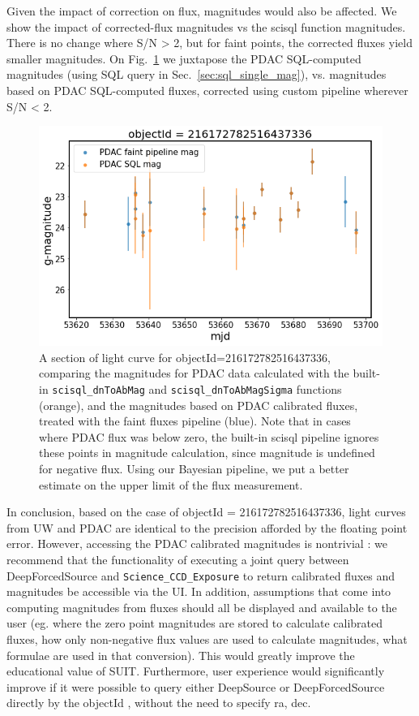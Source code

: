 \documentclass[DM,lsstdraft,toc,usenatbib]{lsstdoc}
\begin{document}
Given the impact of correction on flux, magnitudes would also be affected.  We show the impact of corrected-flux magnitudes vs the scisql function magnitudes.  There is no change where S/N > 2, but for faint points, the corrected fluxes yield smaller magnitudes. On Fig.~\ref{fig:single_faint_detail_mag} we juxtapose the PDAC SQL-computed magnitudes (using SQL query in Sec.~\ref{sec:sql_single_mag}),  vs.  magnitudes based on PDAC SQL-computed fluxes, corrected using custom pipeline wherever S/N < 2.

\begin{figure}
\includegraphics[width=\textwidth]{figs/Single_PDAC_g_mag_compare_detail}
\cprotect\caption{A section of light curve for objectId=216172782516437336, comparing the magnitudes for PDAC data calculated with the built-in \verb|scisql_dnToAbMag| and  \verb|scisql_dnToAbMagSigma|  functions (orange), and the magnitudes based on PDAC calibrated fluxes, treated with the faint fluxes pipeline (blue).  Note that in cases where PDAC flux was below zero, the built-in scisql pipeline ignores these points in magnitude calculation, since magnitude is undefined for negative flux.  Using our Bayesian pipeline, we put a better estimate on the upper limit of the flux measurement.  }
\label{fig:single_faint_detail_mag}
\end{figure}

In conclusion, based on  the case of objectId = 216172782516437336,  light curves from UW and PDAC are identical to the precision afforded by the floating point error. However, accessing the PDAC calibrated magnitudes is nontrivial : we recommend that the functionality of executing a joint query between DeepForcedSource and \verb|Science_CCD_Exposure| to return calibrated fluxes and magnitudes be accessible via the UI.  In addition, assumptions that come into computing magnitudes from fluxes should all be displayed and available to the user     (eg. where the zero point magnitudes are stored to calculate calibrated fluxes, how only non-negative flux values are used to calculate magnitudes, what formulae are used in that conversion). This would greatly improve the educational value of SUIT.  Furthermore, user experience would significantly improve if it were possible to query either DeepSource or DeepForcedSource directly by the objectId , without the need to specify ra, dec. 
\end{document}
